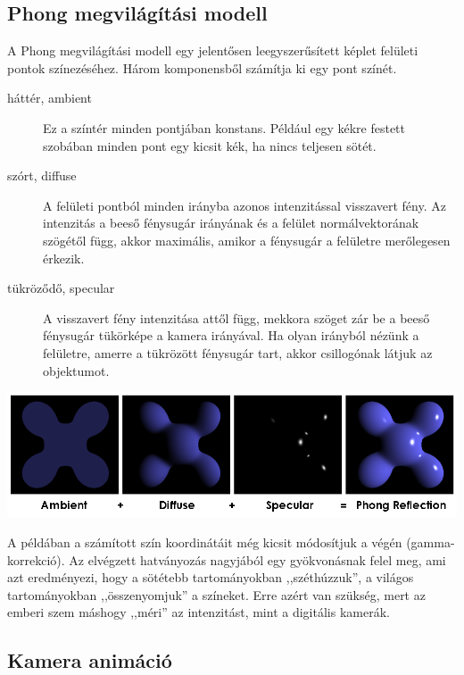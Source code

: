 \subsection{Phong megvilágítási modell}

A Phong megvilágítási modell egy jelentősen leegyszerűsített képlet felületi pontok
színezéséhez. Három komponensből számítja ki egy pont színét.

\begin{description}
  \item[háttér, ambient] Ez a színtér minden pontjában konstans. Például egy kékre festett szobában
  minden pont egy kicsit kék, ha nincs teljesen sötét.
  \item[szórt, diffuse] A felületi pontból minden irányba azonos intenzitással visszavert fény. Az
  intenzitás a beeső fénysugár irányának és a felület normálvektorának szögétől függ,
  akkor maximális, amikor a fénysugár a felületre merőlegesen érkezik.
  \item[tükröződő, specular] A visszavert fény intenzitása attől függ, mekkora szöget zár be
  a beeső fénysugár tükörképe a kamera irányával. Ha olyan irányból nézünk a felületre, amerre
  a tükrözött fénysugár tart, akkor csillogónak látjuk az objektumot.
\end{description}

\begin{center}
  \includegraphics[width=15cm]{images/phong.png}
\end{center}
  


A példában a számított szín koordinátáit még kicsit módosítjuk a végén (gamma-korrekció).
Az elvégzett hatványozás nagyjából egy gyökvonásnak felel meg, ami azt eredményezi, hogy
a sötétebb tartományokban ,,széthúzzuk'', a világos tartományokban ,,összenyomjuk''
a színeket. Erre azért van szükség, mert az emberi szem máshogy ,,méri'' az intenzitást, mint
a digitális kamerák. 

\subsection{Kamera animáció}

